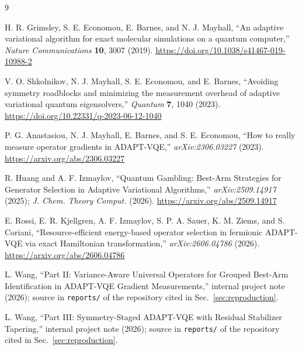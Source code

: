 \documentclass[10pt]{article}
\begin{document}
\begin{thebibliography}{9}
\setlength{\itemsep}{1pt}

H. R. Grimsley, S. E. Economou, E. Barnes, and N. J. Mayhall,
``An adaptive variational algorithm for exact molecular simulations on a quantum computer,''
\emph{Nature Communications} \textbf{10}, 3007 (2019).
\url{https://doi.org/10.1038/s41467-019-10988-2}

V. O. Shkolnikov, N. J. Mayhall, S. E. Economou, and E. Barnes,
``Avoiding symmetry roadblocks and minimizing the measurement overhead of adaptive variational quantum eigensolvers,''
\emph{Quantum} \textbf{7}, 1040 (2023).
\url{https://doi.org/10.22331/q-2023-06-12-1040}

P. G. Anastasiou, N. J. Mayhall, E. Barnes, and S. E. Economou,
``How to really measure operator gradients in ADAPT-VQE,''
\emph{arXiv:2306.03227} (2023).
\url{https://arxiv.org/abs/2306.03227}

R. Huang and A. F. Izmaylov,
``Quantum Gambling: Best-Arm Strategies for Generator Selection in Adaptive Variational Algorithms,''
\emph{arXiv:2509.14917} (2025); \emph{J. Chem. Theory Comput.} (2026).
\url{https://arxiv.org/abs/2509.14917}

E. Rossi, E. R. Kjellgren, A. F. Izmaylov, S. P. A. Sauer, K. M. Ziems, and S. Coriani,
``Resource-efficient energy-based operator selection in fermionic ADAPT-VQE via exact Hamiltonian transformation,''
\emph{arXiv:2606.04786} (2026).
\url{https://arxiv.org/abs/2606.04786}

L. Wang,
``Part II: Variance-Aware Universal Operators for Grouped Best-Arm Identification in ADAPT-VQE Gradient Measurements,''
internal project note (2026); source in \texttt{reports/} of the repository cited in Sec.~\ref{sec:reproduction}.

L. Wang,
``Part III: Symmetry-Staged ADAPT-VQE with Residual Stabilizer Tapering,''
internal project note (2026); source in \texttt{reports/} of the repository cited in Sec.~\ref{sec:reproduction}.

\end{thebibliography}
\end{document}
